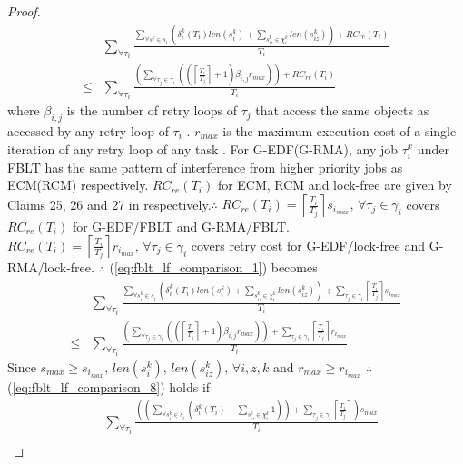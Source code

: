 \documentclass[12pt,english]{report}
\newtheorem{proof}{Proof}
\begin{document}
\begin{proof}
\begin{eqnarray}
 & \sum_{\forall\tau_{i}}\frac{\sum_{\forall s_{i}^{k}\in s_{i}}\left(\delta_{i}^{k}(T_{i})len(s_{i}^{k})+\sum_{s_{iz}^{k}\in\chi_{i}^{k}}len(s_{iz}^{k})\right)+RC_{re}(T_{i})}{T_{i}}\label{eq:fblt_lf_comparison_1}\\
\le & \sum_{\forall\tau_{i}}\frac{\left(\sum_{\forall\tau_{j}\in\gamma_{i}}\left(\left(\left\lceil \frac{T_{i}}{T_{j}}\right\rceil +1\right)\beta_{i,j}r_{max}\right)\right)+RC_{re}(T_{i})}{T_{i}}\nonumber 
\end{eqnarray}
where $\beta_{i,j}$ is the number of retry loops of $\tau_{j}$ that
access the same objects as accessed by any retry loop of $\tau_{i}$
\cite{key-5}. $r_{max}$ is the maximum execution cost of a single
iteration of any retry loop of any task \cite{key-5}. For G-EDF(G-RMA),
any job $\tau_{i}^{x}$ under FBLT has the same pattern of interference
from higher priority jobs as ECM(RCM) respectively. $RC_{re}(T_{i})$
for ECM, RCM and lock-free are given by Claims 25, 26 and 27 in \cite{shambake_phd_proposal}
respectively.$\therefore$ $RC_{re}(T_{i})=\left\lceil \frac{T_{i}}{T_{j}}\right\rceil s_{i_{max}},\,\forall\tau_{j}\in\gamma_{i}$
covers $RC_{re}(T_{i})$ for G-EDF/FBLT and G-RMA/FBLT. $RC_{re}(T_{i})=\left\lceil \frac{T_{i}}{T_{j}}\right\rceil r_{i_{max}},\,\forall\tau_{j}\in\gamma_{i}$
covers retry cost for G-EDF/lock-free and G-RMA/lock-free. $\therefore$
(\ref{eq:fblt_lf_comparison_1}) becomes 
\begin{eqnarray}
 & \sum_{\forall\tau_{i}}\frac{\sum_{\forall s_{i}^{k}\in s_{i}}\left(\delta_{i}^{k}(T_{i})len(s_{i}^{k})+\sum_{s_{iz}^{k}\in\chi_{i}^{k}}len(s_{iz}^{k})\right)+\sum_{\tau_{j}\in\gamma_{i}}\left\lceil \frac{T_{i}}{T_{j}}\right\rceil s_{i_{max}}}{T_{i}}\label{eq:fblt_lf_comparison_8}\\
\le & \sum_{\forall\tau_{i}}\frac{\left(\sum_{\forall\tau_{j}\in\gamma_{i}}\left(\left(\left\lceil \frac{T_{i}}{T_{j}}\right\rceil +1\right)\beta_{i,j}r_{max}\right)\right)+\sum_{\tau_{j}\in\gamma_{i}}\left\lceil \frac{T_{i}}{T_{j}}\right\rceil r_{i_{max}}}{T_{i}}\nonumber 
\end{eqnarray}
Since $s_{max}\ge s_{i_{max}},\, len(s_{i}^{k}),\, len(s_{iz}^{k}),\,\forall i,z,k$
and $r_{max}\ge r_{i_{max}}$ $\therefore$ (\ref{eq:fblt_lf_comparison_8})
holds if 
\begin{eqnarray}
 & \sum_{\forall\tau_{i}}\frac{\left(\left(\sum_{\forall s_{i}^{k}\in s_{i}}\left(\delta_{i}^{k}(T_{i})+\sum_{s_{iz}^{k}\in\chi_{i}^{k}}1\right)\right)+\sum_{\tau_{j}\in\gamma_{i}}\left\lceil \frac{T_{i}}{T_{j}}\right\rceil \right)s_{max}}{T_{i}}\label{eq:fblt_lf_comparison_6}\\

\end{eqnarray}
\end{proof}
\end{document}
